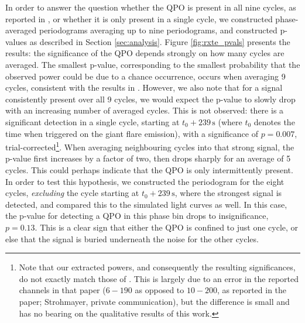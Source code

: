 \documentclass{emulateapj}
\begin{document}
In order to answer the question whether the QPO is present in all nine cycles, as reported in \citet{Strohmayer06}, or whether it is only present in a single cycle, we constructed phase-averaged periodograms averaging up to nine periodograms, and constructed p-values as described in Section \ref{sec:analysis}. Figure \ref{fig:rxte_pvals} presents the results: the significance of the QPO depends strongly on how many cycles are averaged. The smallest p-value, corresponding to the smallest probability that the observed power could be due to a chance occurrence, occurs when averaging 9 cycles, consistent with the results in \citet{Strohmayer06}. However, we also note that for a signal consistently present over all 9 cycles, we would expect the p-value to slowly drop with an increasing number of averaged cycles. This is not observed: there is a significant detection in a single cycle, starting at $t_0 + 239 \,\mathrm{s}$ (where $t_0$ denotes the time when \rxte triggered on the giant flare emission), with a significance of $p = 0.007$, trial-corrected\footnote{Note that our extracted powers, and consequently the resulting significances, do not exactly match those of \citet{strohmayer2006}. This is largely due to an error in the reported channels in that paper ($6-190$ as opposed to $10-200$, as reported in the paper; Strohmayer, private communication), but the difference is small and has no bearing on the qualitative results of this work.}. When averaging neighbouring cycles into that strong signal, the p-value first increases by a factor of two, then drops sharply for an average of 5 cycles. This could perhaps indicate that the QPO is only intermittently present. In order to test this hypothesis, we constructed the periodogram for the eight cycles, {\it excluding} the cycle starting at $t_0 + 239\, \mathrm{s}$, where the strongest signal is detected, and compared this to the simulated light curves as well. In this case, the p-value for detecting a QPO in this phase bin drops to insignificance, $p = 0.13$. This is a clear sign that either the QPO is confined to just one cycle, or else that the signal is buried underneath the noise for the other cycles. 
\end{document}
